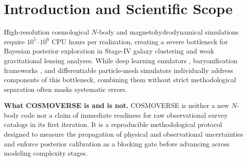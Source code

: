 \documentclass[twocolumn,10pt]{article}
\begin{document}
\section{Introduction and Scientific Scope}
High-resolution cosmological $N$-body and magnetohydrodynamical simulations require $10^5$--$10^6$ CPU hours per realization, creating a severe bottleneck for Bayesian posterior exploration in Stage-IV galaxy clustering and weak gravitational lensing analyses. While deep learning emulators \cite{TUNeS2026,Jamieson2023FieldEmulator,Li2020FNO}, baryonification frameworks \cite{GiriSchneider2021,Arico2021BACCO}, and differentiable particle-mesh simulators \cite{SimonOnfroy2025JaxPMMCLMC} individually address components of this bottleneck, combining them without strict methodological separation often masks systematic errors.

\textbf{What COSMOVERSE is and is not.} COSMOVERSE is neither a new $N$-body code nor a claim of immediate readiness for raw observational survey catalogs in its first iteration. It is a reproducible methodological protocol designed to measure the propagation of physical and observational uncertainties and enforce posterior calibration as a blocking gate before advancing across modeling complexity stages.
\end{document}
